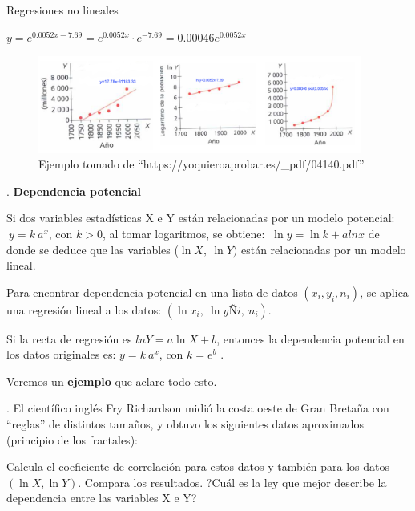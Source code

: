 \begin{myalertblock}{Regresiones no lineales}
\begin{example}
$y=e^{0.0052x-7.69}=e^{0.0052x}\cdot e^{-7.69}=0.00046 e^{0.0052 x}$


	\begin{figure}[H]
			\centering
			\includegraphics[width=0.95\textwidth]{imagenes/imagenes03/T03IM15.png}
			\caption*{\textcolor{gris}{\footnotesize{Ejemplo tomado de ``https://yoquieroaprobar.es/\_pdf/04140.pdf''}}}
	\end{figure}
\end{example}

\begin{theorem}
.	\textbf{Dependencia potencial}

\vspace{2mm} Si dos variables estadísticas X e Y están relacionadas por un modelo potencial: $\ y=k\ a^x$, con $k > 0$, al tomar logaritmos, se obtiene:
$\ \ln y = \ln k + a ln x$ de donde se deduce que las variables ($\ln X, \ \ln Y)$ están relacionadas por un modelo lineal.

\vspace{2mm} Para encontrar dependencia potencial en una lista de datos $(x_i, y_i, n_i)$, se aplica una regresión lineal a los datos: $(\ln x_i,\ \ln yÑi,\ n_i)$.

\vspace{2mm} Si la recta de regresión es $ln Y = a \ln X + b$, entonces la dependencia potencial en los datos originales es: $y=k\ a^x$, con $k=e^b$ .	

\vspace{2mm} Veremos un \textbf{ejemplo} que aclare todo esto.
\end{theorem}

\begin{example}
.	El científico inglés Fry Richardson midió la costa oeste de Gran Bretaña con ``reglas'' de distintos tamaños, y obtuvo los siguientes datos aproximados \textcolor{gris}{(principio de los fractales)}:	

\vspace{2mm} Calcula el coeficiente de correlación para estos datos y también para los datos $(\ln X, \ln Y)$. Compara los resultados. ?Cuál es la ley que mejor describe la dependencia entre las variables X e Y?


\end{example}
\end{myalertblock}
